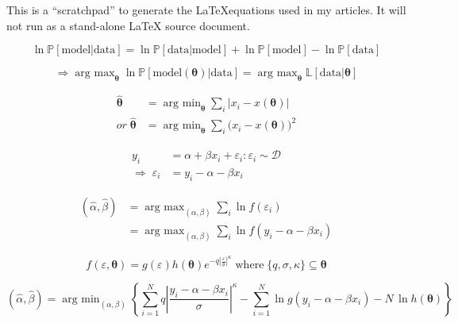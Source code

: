 This is a ``scratchpad'' to generate the \LaTeX equations used in my articles. It will not run as a stand-alone LaTeX source document.

\DeclareMathOperator*{\argmax}{arg~max}
\DeclareMathOperator*{\argmin}{arg~min}

\begin{equation}
\ln\mathbb{P}[\mathrm{model}|\mathrm{data}]=\ln\mathbb{P}[\mathrm{data}|\mathrm{model}]+\ln\mathbb{P}[\mathrm{model}]-
\ln\mathbb{P}[\mathrm{data}]
\end{equation}

\begin{equation}
\Rightarrow\argmax_{\boldsymbol{\theta}}\ln\mathbb{P}[\mathrm{model}(\boldsymbol{\theta})|\mathrm{data}]=\argmax_{\boldsymbol{\theta}}\mathbb{L}[\mathrm{data}|\boldsymbol{\theta}]
\end{equation}

\begin{align}
\hat{\boldsymbol{\theta}}&=\argmin_{\boldsymbol{\theta}}\sum_i\Big|x_i-x(\boldsymbol{\theta})\Big|\\
\textit{or}\;
\hat{\boldsymbol{\theta}}&=\argmin_{\boldsymbol{\theta}}\sum_i\Big(x_i-x(\boldsymbol{\theta})\Big)^2
\end{align}

\begin{align}
y_i&=\alpha+\beta x_i+\varepsilon_i : \varepsilon_i\sim\mathcal{D}\\
\Rightarrow\;\varepsilon_i&=y_i-\alpha-\beta x_i
\end{align}

\begin{align}
    (\hat{\alpha},\hat{\beta})&=\argmax_{(\alpha,\beta)}\sum_i\ln f(\varepsilon_i)\\
    &=\argmax_{(\alpha,\beta)}\sum_i\ln f(y_i-\alpha-\beta x_i)
\end{align}

\begin{equation}
f(\varepsilon,\boldsymbol{\theta})=g(\varepsilon)h(\boldsymbol{\theta})e^{-q\left|\frac{\varepsilon}{\sigma}\right|^\kappa}\;\mathrm{where}\;\{q,\sigma,\kappa\}\subseteq\boldsymbol{\theta}
\end{equation}

\begin{equation*}
    (\hat{\alpha},\hat{\beta})=\argmin_{(\alpha,\beta)}\left\{
    \sum_{i=1}^Nq\left|\frac{y_i-\alpha-\beta x_i}{\sigma}\right|^\kappa
    -\sum_{i=1}^N\ln g(y_i-\alpha-\beta x_i)-N\,\ln h(\boldsymbol{\theta})\right\}
\end{equation*}


